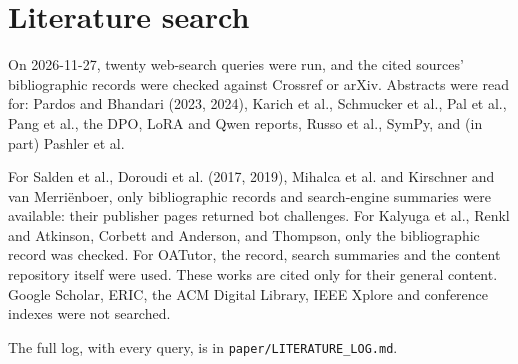 \documentclass[11pt,a4paper]{article}
\begin{document}
\section{Literature search}
\label{app:search}
On 2026-11-27, twenty web-search queries were run, and the cited sources' bibliographic
records were checked against Crossref or arXiv. Abstracts were read for: Pardos and
Bhandari (2023, 2024), Karich et al., Schmucker et al., Pal et al., Pang et al., the DPO,
LoRA and Qwen reports, Russo et al., SymPy, and (in part) Pashler et al.

For Salden et al., Doroudi et al. (2017, 2019), Mihalca et al. and Kirschner and van
Merriënboer, only bibliographic records and search-engine summaries were available: their
publisher pages returned bot challenges. For Kalyuga et al., Renkl and Atkinson, Corbett and
Anderson, and Thompson, only the bibliographic record was checked. For OATutor, the record,
search summaries and the content repository itself were used. These works are cited only
for their general content. Google Scholar, ERIC, the ACM Digital Library, IEEE Xplore and conference indexes
were not searched.

The full log, with every query, is in \texttt{paper/LITERATURE\_LOG.md}.
\end{document}
